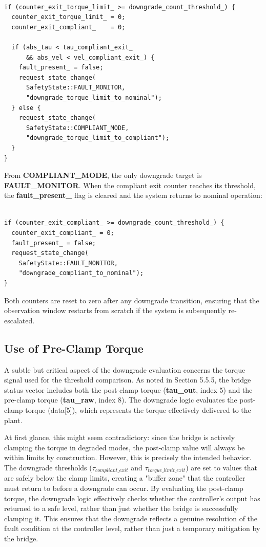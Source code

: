 \begin{verbatim}

if (counter_exit_torque_limit_ >= downgrade_count_threshold_) {
  counter_exit_torque_limit_ = 0;
  counter_exit_compliant_    = 0;

  if (abs_tau < tau_compliant_exit_
      && abs_vel < vel_compliant_exit_) {
    fault_present_ = false;
    request_state_change(
      SafetyState::FAULT_MONITOR,
      "downgrade_torque_limit_to_nominal");
  } else {
    request_state_change(
      SafetyState::COMPLIANT_MODE,
      "downgrade_torque_limit_to_compliant");
  }
}

\end{verbatim}

From \textbf{COMPLIANT\_MODE}, the only downgrade target is \textbf{FAULT\_MONITOR}. When the compliant exit counter reaches its threshold, the \textbf{fault\_present\_} flag is cleared and the system returns to nominal operation:

\begin{verbatim}

if (counter_exit_compliant_ >= downgrade_count_threshold_) {
  counter_exit_compliant_ = 0;
  fault_present_ = false;
  request_state_change(
    SafetyState::FAULT_MONITOR,
    "downgrade_compliant_to_nominal");
}

\end{verbatim}

Both counters are reset to zero after any downgrade transition, ensuring that the observation window restarts from scratch if the system is subsequently re-escalated.

\subsection{Use of Pre-Clamp Torque}
A subtle but critical aspect of the downgrade evaluation concerns the torque signal used for the threshold comparison. As noted in Section 5.5.5, the bridge status vector includes both the post-clamp torque (\textbf{tau\_out}, index 5) and the pre-clamp torque (\textbf{tau\_raw}, index 8). The downgrade logic evaluates the post-clamp torque (data[5]), which represents the torque effectively delivered to the plant.

At first glance, this might seem contradictory: since the bridge is actively clamping the torque in degraded modes, the post-clamp value will always be within limits by construction. However, this is precisely the intended behavior. The downgrade thresholds ($\tau_{compliant\_exit}$ and $\tau_{torque\_limit\_exit}$) are set to values that are safely below the clamp limits, creating a "buffer zone" that the controller must return to before a downgrade can occur. By evaluating the post-clamp torque, the downgrade logic effectively checks whether the controller's output has returned to a safe level, rather than just whether the bridge is successfully clamping it. This ensures that the downgrade reflects a genuine resolution of the fault condition at the controller level, rather than just a temporary mitigation by the bridge.

